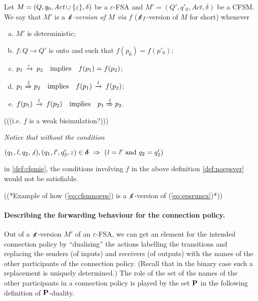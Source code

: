 \begin{definition}
\label{def:noepsver}
Let $M=(Q,q_0,\textit{Act}\cup\{\varepsilon\},\delta)$ be a $\varepsilon$-FSA
and $M'=(Q',q'_0,\textit{Act},\delta)$ be a CFSM.
We say that $M'$ is a {\em $\not\hspace{-1pt}\bm{\varepsilon}$-version of $M$ via $f$} ($\not\hspace{-1pt}\bm{\varepsilon}_f$-version of $M$ for short)
whenever 
\begin{enumerate}[a)]
\item
$M'$ is deterministic;
\item 
$f:Q\to Q'$ is onto and such that $f(p_0) = f(p'_0)$;
\item
$p_1\,\xrightarrow{\epsilon}_{{}}\,p_2 \quad\text{implies}\quad f(p_1)=f(p_2)$; 
\item
$p_1\LTS{\elle}p_2 \quad\text{implies}\quad f(p_1)\lts{\elle}f(p_2)$; 
\item
\label{def:noepsver-e}
$ f(p_1)\lts{\elle}f(p_2)\quad\text{implies}\quad p_1\LTS{\elle}p_2$.
\end{enumerate}
\end{definition}
(((i.e. $f$ is a weak bisimulation?)))

\begin{remark}
\label{rem:neccond}
{\em
Notice that without the condition\\
\centerline{
$(q_1,\mathit{l},q_2,\not\iota), (q_1,\mathit{l}',q'_2,z)\in\bm{\delta} ~\Rightarrow~ (\mathit{l}=\mathit{l}' \text{ and } q_2=q'_2)$}
in \cref{def:cfsmie}, the conditions involving $f$ in the above definition \cref{def:noepsver} would not be satisfiable. \finex
}
\end{remark}

\begin{example}
((*Example of how (\ref{eq:cfsmnoeps}) is a $\not\hspace{-1pt}\bm{\varepsilon}$-version of (\ref{eq:epsrunex})*))
\end{example}

\paragraph{Describing the forwarding behaviour for the connection policy.}
Out of a $\not\hspace{-1pt}\bm{\varepsilon}$-version $M'$ of an $\varepsilon$-FSA, 
we can get an element for the intended connection policy by ``dualising'' the actions labelling the transitions and replacing the senders (of inputs) and receivers (of outputs) with
the names of the other participants of the connection policy. (Recall that in the binary case
such a replacement is uniquely determined.) 
The role of the set of the names of the other participants in a connection policy
is played by the set $\mathbf{P}$ in the following definition of $\mathbf{P}$-duality.

